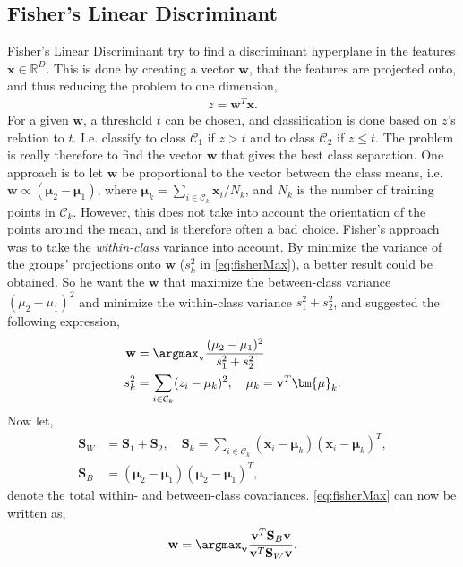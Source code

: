 \subsection{Fisher's Linear Discriminant}
\label{sub:Fisher's Linear Discriminant}
Fisher's Linear Discriminant try to find a discriminant hyperplane in the features $\mathbf{x}\in \mathbb{R}^D$. This is done by creating a vector $\mathbf{w}$, that the features are projected onto, and thus reducing the problem to one dimension,
\begin{align}
  z = \mathbf{w}^T\mathbf{x}.
\end{align}
For a given $\mathbf{w}$,  a threshold $t$ can be chosen, and classification is done based on $z$'s relation to $t$.  I.e. classify to class $\mathcal{C}_1$ if $z > t$ and to class $\mathcal{C}_2$ if $z \leq t $. The problem is really therefore to find the vector $\mathbf{w}$ that gives the best class separation. One approach is to let $\mathbf{w}$ be proportional to the vector between the class means, i.e. $\mathbf{w} \propto (\bm{\mu}_2 - \bm{\mu}_1)$, where $\bm{\mu}_k = \sum_{i \in \mathcal{C}_k} \mathbf{x}_i/N_k$, and $N_k$ is the number of training points in $\mathcal{C}_k$. 
However, this does not take into account the orientation of the points around the mean, and is therefore often a bad choice. 
Fisher's approach was to take the \textit{within-class} variance into account. By minimize the variance of the groups' projections onto $\mathbf{w}$ ($s_k^2$ in \eqref{eq:fisherMax}), a better result could be obtained. So he want the $\mathbf{w}$ that maximize the between-class variance $(\mu_2 - \mu_1)^2$ and minimize the within-class variance $s_1^2 + s_2^2$, and suggested the following expression,
\begin{align}
  \label{eq:fisherMax} 
  \mathbf{w} &= \argmax_{\mathbf{v}} \frac{(\mu_2 - \mu_1)^2}{s_1^2 + s_2^2} \\
  s_k^2 &= \sum_{i \in \mathcal{C}_k} (z_i - \mu_k)^2, \quad \mu_k = \mathbf{v}^T\bm{\mu}_k.
\end{align}
Now let,
\begin{align}
  \mathbf{S}_W &= \mathbf{S}_1 + \mathbf{S}_2, \quad  \mathbf{S}_k =  \sum_{i \in \mathcal{C}_k} (\mathbf{x}_i - \bm{\mu}_k)(\mathbf{x}_i - \bm{\mu}_k)^T, \\
  \label{eq:SB} 
  \mathbf{S}_B &= (\bm{\mu}_2 - \bm{\mu}_1)(\bm{\mu}_2 - \bm{\mu}_1)^T,
\end{align}
denote the total within- and between-class covariances. \eqref{eq:fisherMax} can now be written as,
\begin{align}
  \mathbf{w} = \argmax_{\mathbf{v}}  \frac{\mathbf{v}^T\mathbf{S}_B \mathbf{v}}{\mathbf{v}^T \mathbf{S}_W \mathbf{v}}.
\end{align}
